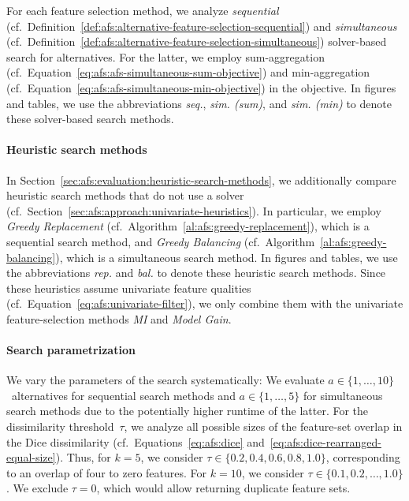 \documentclass{article}
\theoremstyle{definition}
\begin{document}
For each feature selection method, we analyze \emph{sequential} (cf.~Definition~\ref{def:afs:alternative-feature-selection-sequential}) and \emph{simultaneous} (cf.~Definition~\ref{def:afs:alternative-feature-selection-simultaneous}) solver-based search for alternatives.
For the latter, we employ sum-aggregation (cf.~Equation~\ref{eq:afs:afs-simultaneous-sum-objective}) and min-aggregation (cf.~Equation~\ref{eq:afs:afs-simultaneous-min-objective}) in the objective.
In figures and tables, we use the abbreviations \emph{seq.}, \emph{sim. (sum)}, and \emph{sim. (min)} to denote these solver-based search methods.

\paragraph{Heuristic search methods}

In Section~\ref{sec:afs:evaluation:heuristic-search-methods}, we additionally compare heuristic search methods that do not use a solver (cf.~Section~\ref{sec:afs:approach:univariate-heuristics}).
In particular, we employ \emph{Greedy Replacement} (cf.~Algorithm~\ref{al:afs:greedy-replacement}), which is a sequential search method, and \emph{Greedy Balancing} (cf.~Algorithm~\ref{al:afs:greedy-balancing}), which is a simultaneous search method.
In figures and tables, we use the abbreviations \emph{rep.} and \emph{bal.} to denote these heuristic search methods.
Since these heuristics assume univariate feature qualities (cf.~Equation~\ref{eq:afs:univariate-filter}), we only combine them with the univariate feature-selection methods \emph{MI} and \emph{Model Gain}.

\paragraph{Search parametrization}

We vary the parameters of the search systematically:
We evaluate $a \in \{1, \dots, 10\}$~alternatives for sequential search methods and $a \in \{1, \dots, 5\}$ for simultaneous search methods due to the potentially higher runtime of the latter.
For the dissimilarity threshold~$\tau$, we analyze all possible sizes of the feature-set overlap in the Dice dissimilarity (cf.~Equations~\ref{eq:afs:dice} and~\ref{eq:afs:dice-rearranged-equal-size}).
Thus, for $k=5$, we consider $\tau \in \{0.2, 0.4, 0.6, 0.8, 1.0\}$, corresponding to an overlap of four to zero features.
For $k=10$, we consider $\tau \in \{0.1, 0.2, \dots, 1.0\}$.
We exclude $\tau = 0$, which would allow returning duplicate feature sets.
\end{document}
